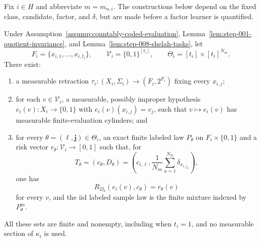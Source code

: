 Fix \(i\in H\) and abbreviate \(m=m_{n,i}\).  The constructions below
depend on the fixed class, candidate, factor, and \(\delta\), but are made
before a factor learner is quantified.

\begin{lemma}
\label{lem:step-010-finite-coding}
Under Assumption~\ref{assump:countably-coded-evaluation},
Lemma~\ref{lem:step-001-quotient-invariance}, and
Lemma~\ref{lem:step-008-shelah-tasks}, let
\begin{equation}\label{eq:step-010-finite-sets}
F_i=\{x_{i,1},\ldots,x_{i,t_i}\},
\qquad
\mathcal V_i=\{0,1\}^{[t_i]},
\qquad
\Theta_i=[t_i]\times[t_i]^{N_m}.
\end{equation}
There exist:
\begin{enumerate}
\item a measurable retraction
\(\tau_i:(X_i,\Sigma_i)\to(F_i,2^{F_i})\) fixing every \(x_{i,j}\);
\item for each \(v\in\mathcal V_i\), a measurable, possibly improper
hypothesis \(e_i(v):X_i\to\{0,1\}\) with
\(e_i(v)(x_{i,j})=v_j\), such that \(v\mapsto e_i(v)\) has measurable
finite-evaluation cylinders; and
\item for every \(\theta=(\ell,\mathbf j)\in\Theta_i\), an exact finite
labeled law \(P_\theta\) on \(F_i\times\{0,1\}\) and a risk vector
\(r_\theta:\mathcal V_i\to[0,1]\) such that, for
\begin{equation}\label{eq:step-010-indexed-task}
T_\theta=(c_\theta,D_\theta)
=\left(c_{i,\ell},\frac1{N_m}\sum_{a=1}^{N_m}
\delta_{x_{i,j_a}}\right),
\end{equation}
one has
\begin{equation}\label{eq:step-010-exact-coded-risk}
R_{D_\theta}(e_i(v),c_\theta)=r_\theta(v)
\end{equation}
for every \(v\), and the iid labeled sample law is the finite mixture
indexed by \(P_\theta^m\).
\end{enumerate}
All these sets are finite and nonempty, including when \(t_i=1\), and no
measurable section of \(\kappa_i\) is used.
\end{lemma}

